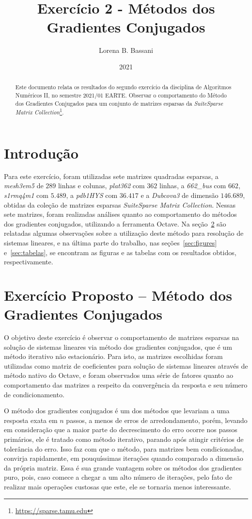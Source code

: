 \documentclass{article}
\title{Exercício 2 - Métodos dos Gradientes Conjugados}
\author{Lorena B. Bassani}
\date{2021}
\begin{document}
\maketitle

\begin{abstract}
    Este documento relata os resultados do segundo exercício da disciplina de Algoritmos Numéricos II, no semestre 2021/01 EARTE. Observar o comportamento do Método dos Gradientes Conjugados para um conjunto de matrizes esparsas da \textit{SuiteSparse Matrix Collection}\footnote{\href{https://sparse.tamu.edu}{https://sparse.tamu.edu}}.
\end{abstract}

\section{Introdução}
Para este exercício, foram utilizadas sete matrizes quadradas esparsas, a \textit{mesh3em5} de $289$ linhas e colunas, \textit{plat362} com $362$ linhas, a \textit{662\_bus} com $662$, \textit{s1rmq4m1} com $5.489$, a \textit{pdb1HYS} com $36.417$ e a \textit{Dubcova3} de dimensão $146.689$, obtidas da coleção de matrizes esparsas \textit{SuiteSparse Matrix Collection}. Nessas sete matrizes, foram realizadas análises quanto ao comportamento do métodos dos gradientes conjugados, utilizando a ferramenta Octave. Na seção~\ref{sec:resultados} são relatadas algumas observações sobre a utilização deste método para resolução de sistemas lineares, e na última parte do trabalho, nas seções~\ref{sec:figures} e~\ref{sec:tabelas}, se encontram as figuras e as tabelas com os resultados obtidos, respectivamente.

\section{Exercício Proposto -- Método dos Gradientes Conjugados}
\label{sec:resultados}
O objetivo deste exercício é observar o comportamento de matrizes esparsas na solução de sistemas lineares via método dos gradientes conjugados, que é um método iterativo não estacionário. Para isto, as matrizes escolhidas foram utilizadas como matriz de coeficientes para solução de sistemas lineares através de método nativo do Octave, e foram observados uma série de fatores quanto ao comportamento das matrizes a respeito da convergência da resposta e seu número de condicionamento.

O método dos gradientes conjugados é um dos métodos que levariam a uma resposta exata em $n$ passos, a menos de erros de arredondamento, porém, levando em consideração que a maior parte do decrescimento do erro ocorre nos passos primários, ele é tratado como método iterativo, parando após atingir critérios de tolerância do erro. Isso faz com que o método, para matrizes bem condicionadas, convirja rapidamente, em pouquíssimas iterações quando comparado a dimensão da própria matriz. Essa é sua grande vantagem sobre os métodos dos gradientes puro, pois, caso comece a chegar a um alto número de iterações, pelo fato de realizar mais operações custosas que este, ele se tornaria menos interessante.
\end{document}
